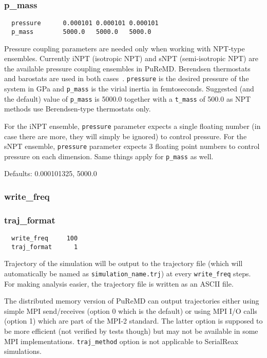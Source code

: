 \documentclass{article}
\begin{document}
\subsubsection{p\_mass}
\label{sec:p_mass}

\begin{verbatim}
  pressure      0.000101 0.000101 0.000101
  p_mass        5000.0   5000.0   5000.0
\end{verbatim}
Pressure coupling parameters are needed only when working with NPT-type 
ensembles. Currently iNPT (isotropic NPT) and sNPT (semi-isotropic NPT) 
are the available pressure coupling ensembles in PuReMD. Berendsen 
thermostats and barostats are used in both cases~\cite{ref:berendsen}. 
{\tt pressure} is the desired pressure of the system in GPa and {\tt p\_mass}
is the virial inertia in femtoseconds. Suggested (and the default) value of
{\tt p\_mass} is 5000.0 together with a {\tt t\_mass} of 500.0 as NPT methods
use Berendsen-type thermostats only.

For the iNPT ensemble, {\tt pressure} parameter expects a single
floating number (in case there are more, they will simply be ignored) 
to control pressure. For the sNPT ensemble, {\tt pressure} parameter 
expects 3 floating point numbers to control pressure on each dimension.
Same things apply for {\tt p\_mass} as well.

Defaults: 0.000101325, 5000.0

\subsubsection{write\_freq}
\label{sec:write_freq}
\subsubsection{traj\_format}
\label{sec:traj_format}

\begin{verbatim}
  write_freq     100
  traj_format      1
\end{verbatim}
Trajectory of the simulation will be output to the trajectory file 
(which will automatically be named as {\tt simulation\_name.trj}) at 
every {\tt write\_freq} steps. For making analysis easier, the trajectory 
file is written as an ASCII file.

The distributed memory version of PuReMD
can output trajectories either using simple MPI send/receives 
(option 0 which is the default) or using MPI I/O calls (option 1) which 
are part of the MPI-2 standard. The latter option is supposed to be more 
efficient (not verified by tests though) but may not be available in some 
MPI implementations. {\tt traj\_method} option is not applicable to 
SerialReax simulations.
\end{document}
